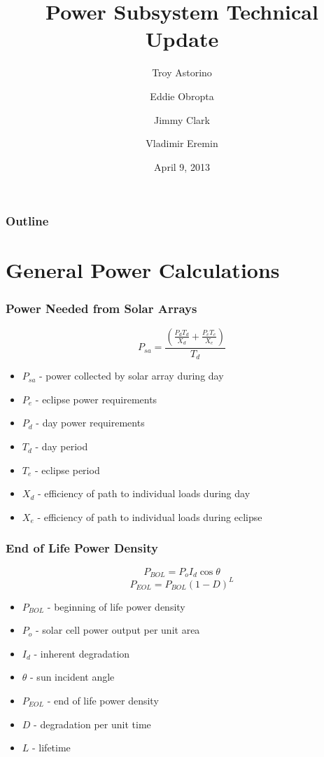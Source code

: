 \documentclass{beamer}
\title{Power Subsystem Technical Update}
\author{Troy Astorino \and Eddie Obropta \and Jimmy Clark \and Vladimir Eremin}
\date{April 9, 2013}
\institute[16.83 -- MIT]{Space Systems Design \\ Massachusetts Institute of
  Technology}
\begin{document}
\begin{frame}
\maketitle
\end{frame}

\begin{frame}
  \frametitle{Outline}
  \tableofcontents
\end{frame}

\section{General Power Calculations}
\begin{frame}
  \frametitle{Power Needed from Solar Arrays}
  \[P_{sa} = \frac{\left(\frac{P_d T_d}{X_d} + \frac{P_e
        T_e}{X_e}\right)}{T_d}\]

  \begin{itemize}
    \item $P_{sa}$ - power collected by solar array during day
    \item $P_e$ - eclipse power requirements
    \item $P_d$ - day power requirements
    \item $T_d$ - day period
    \item $T_e$ - eclipse period
    \item $X_d$ - efficiency of path to individual loads during day
    \item $X_e$ - efficiency of path to individual loads during eclipse
  \end{itemize}
\end{frame}

\begin{frame}
  \frametitle{End of Life Power Density}
  \[P_{BOL} = P_o I_d \cos{\theta}\]
  \[P_{EOL} = P_{BOL} (1 - D)^L\]

  \begin{itemize}
    \item $P_{BOL}$ - beginning of life power density
    \item $P_o$ - solar cell power output per unit area
    \item $I_d$ - inherent degradation
    \item $\theta$ - sun incident angle
    \item $P_{EOL}$ - end of life power density
    \item $D$ - degradation per unit time
    \item $L$ - lifetime
  \end{itemize}
\end{frame}
\end{document}
